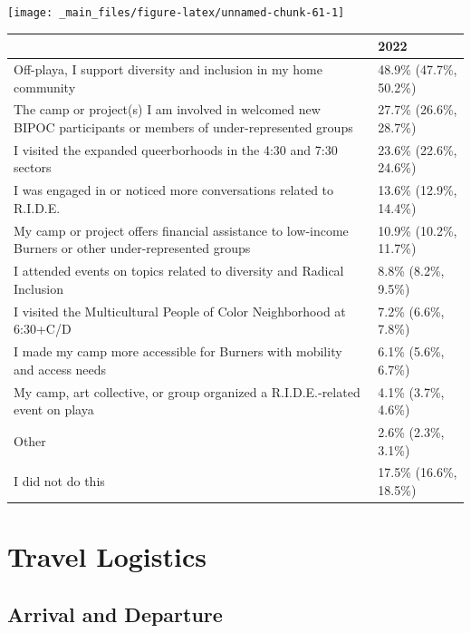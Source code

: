 \documentclass[
]{book}
\begin{document}
\texttt{[image: \_main\_files/figure-latex/unnamed-chunk-61-1]}

\begin{table}
\centering
\begin{tabular}[t]{>{}l|>{}l}
\hline
  & 2022\\
\hline
Off-playa, I support diversity and 
 inclusion in my home community & 48.9\% (47.7\%, 50.2\%)\\
\hline
The camp or project(s) I am involved in 
 welcomed new BIPOC participants or 
 members of under-represented groups & 27.7\% (26.6\%, 28.7\%)\\
\hline
I visited the expanded queerborhoods 
 in the 4:30 and 7:30 sectors & 23.6\% (22.6\%, 24.6\%)\\
\hline
I was engaged in or noticed more 
 conversations related to R.I.D.E. & 13.6\% (12.9\%, 14.4\%)\\
\hline
My camp or project offers financial assistance 
 to low-income Burners or 
 other under-represented groups & 10.9\% (10.2\%, 11.7\%)\\
\hline
I attended events on topics related to 
 diversity and Radical Inclusion & 8.8\% (8.2\%, 9.5\%)\\
\hline
I visited the Multicultural People of Color 
 Neighborhood at 6:30+C/D & 7.2\% (6.6\%, 7.8\%)\\
\hline
I made my camp more accessible for 
 Burners with mobility and access needs & 6.1\% (5.6\%, 6.7\%)\\
\hline
My camp, art collective, or group 
 organized a R.I.D.E.-related event 
 on playa & 4.1\% (3.7\%, 4.6\%)\\
\hline
Other & 2.6\% (2.3\%, 3.1\%)\\
\hline
I did not do this & 17.5\% (16.6\%, 18.5\%)\\
\hline
\end{tabular}
\end{table}

\hypertarget{travel-logistics}{%
\chapter{Travel Logistics}\label{travel-logistics}}

\hypertarget{arrival-and-departure}{%
\section{Arrival and Departure}\label{arrival-and-departure}}
\end{document}
